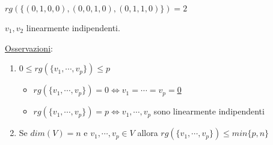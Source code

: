\documentclass{article}
\newcommand{\ul}[1]{\underline{#1}}
\begin{document}
$rg(\{(0,1,0,0),(0,0,1,0),(0,1,1,0)\})=2$

$v_1,v_2$ linearmente indipendenti.

\ul{Osservazioni}:
\begin{enumerate}
	\item $0\leq rg(\{v_1,\cdots,v_p\})\leq p$
	      \begin{itemize}
		      \item $rg(\{v_1,\cdots,v_p\})=0\Leftrightarrow v_1=\cdots=v_p=$\ul{0}
		      \item $rg(\{v_1,\cdots,v_p\})=p\Leftrightarrow v_1,\cdots,v_p$ sono linearmente indipendenti
	      \end{itemize}
	\item Se $dim(V)=n$ e $v_1,\cdots,v_p\in V$ allora $rg(\{v_1,\cdots,v_p\})\leq min\{p,n\}$
\end{enumerate}
\end{document}
